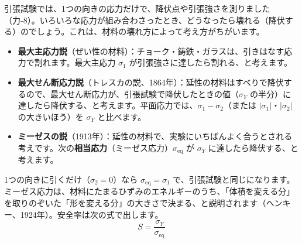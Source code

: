 \leavevmode\label{ph:力-9:sec9}引張試験では、1つの向きの応力だけで、降伏点や引張強さを測りました（力-8）。いろいろな応力が組み合わさったとき、どうなったら壊れる（降伏する）のでしょう。これは、材料の壊れ方によって考え方がちがいます。
\begin{itemize}[leftmargin=1.2\zw, itemsep=2pt, topsep=1pt, label={\color{bkTheme}●}]
\item \textbf{最大主応力説}（ぜい性の材料）：チョーク・鋳鉄・ガラスは、引きはなす応力で割れます。最大主応力 $\sigma_1$ が引張強さに達したら割れる、と考えます。
\item \textbf{最大せん断応力説}（トレスカの説、1864年）：延性の材料はすべりで降伏するので、最大せん断応力が、引張試験で降伏したときの値（$\sigma_Y$ の半分）に達したら降伏する、と考えます。平面応力では、$\sigma_1-\sigma_2$（または $|\sigma_1|$・$|\sigma_2|$ の大きいほう）を $\sigma_Y$ と比べます。
\item \textbf{ミーゼスの説}（1913年）：延性の材料で、実験にいちばんよく合うとされる考えです。次の\textbf{相当応力}（ミーゼス応力）$\sigma_{\mathrm{eq}}$ が $\sigma_Y$ に達したら降伏する、と考えます。
\end{itemize}
\label{ph:力-9:mises}1つの向きに引くだけ（$\sigma_2=0$）なら $\sigma_{\mathrm{eq}}=\sigma_1$ で、引張試験と同じになります。ミーゼス応力は、材料にたまるひずみのエネルギーのうち、「体積を変える分」を取りのぞいた「形を変える分」の大きさで決まる、と説明されます（ヘンキー、1924年）。安全率は次の式で出します。
\[S=\frac{\sigma_Y}{\sigma_{\mathrm{eq}}}\]
